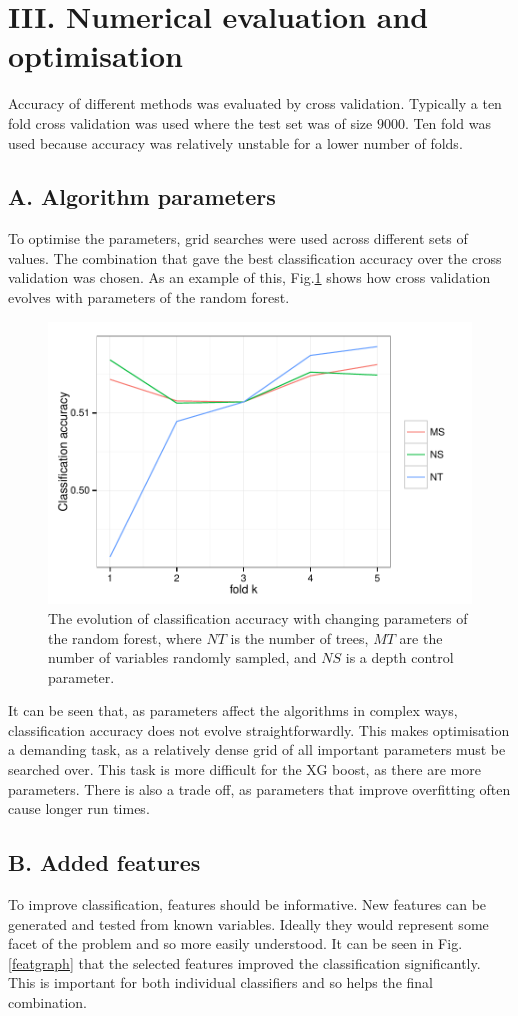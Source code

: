 \documentclass[onecolumn,prl,aps,10pt]{revtex4}
\begin{document}
\section{III. Numerical evaluation and optimisation} 
Accuracy of different methods was evaluated by cross validation. Typically a ten fold cross validation was used where the test set was of size $9000$. Ten fold was used because accuracy was relatively unstable for a lower number of folds. 

\subsection{A. Algorithm parameters}
To optimise the parameters, grid searches were used across different sets of values. The combination that gave the best classification accuracy over the cross validation was chosen. As an example of this, Fig.\ref{vargraph} shows how cross validation evolves with parameters of the random forest.

\begin{figure}
\includegraphics*[height=0.4\linewidth , width=0.8\linewidth,clip]{variables.pdf}
\caption{The evolution of classification accuracy with changing parameters of the random forest, where $NT$ is the number of trees, $MT$ are the number of variables randomly sampled, and $NS$ is a depth control parameter.} \label{vargraph}
\end{figure}

It can be seen that, as parameters affect the algorithms in complex ways, classification accuracy does not evolve straightforwardly. This makes optimisation a demanding task, as  a relatively dense grid of all important parameters must be searched over. This task is more difficult for the XG boost, as there are more parameters. There is also a trade off, as parameters that improve overfitting often cause longer run times. 

\subsection{B. Added features}
To improve classification, features should be informative. New features can be generated and tested from known variables. Ideally they would represent some facet of the problem and so more easily understood. It can be seen in Fig.\ref{featgraph} that the selected features improved the classification significantly. This is important for both individual classifiers and so helps the final combination. 
\end{document}
